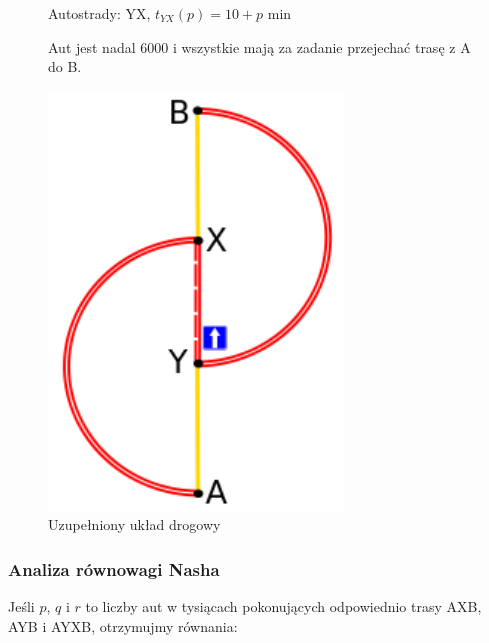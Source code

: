 \documentclass[twoside,12pt]{report}
\begin{document}
\vspace*{70px}
\begin{figure}[h]
\begin{flushleft}
\begin{minipage}{.50\textwidth}
Autostrady:\newline
YX, $t_{YX}(p) =  10 + p$ min\newline

\vspace*{20px}
Aut jest nadal 6000 i wszystkie mają za zadanie przejechać trasę z A do B.
\end{minipage}%
\end{flushleft}
\begin{flushright}
	\begin{minipage}{.50\textwidth}
	\centering
	\includegraphics[width=0.7\textwidth]{img/braess2}
	\caption{Uzupełniony układ drogowy}
	\end{minipage}
\end{flushright}
\end{figure}

\subsubsection{Analiza równowagi Nasha}

Jeśli $p$, $q$ i $r$ to liczby aut w tysiącach pokonujących odpowiednio trasy AXB, AYB i AYXB, otrzymujmy równania:
\end{document}

